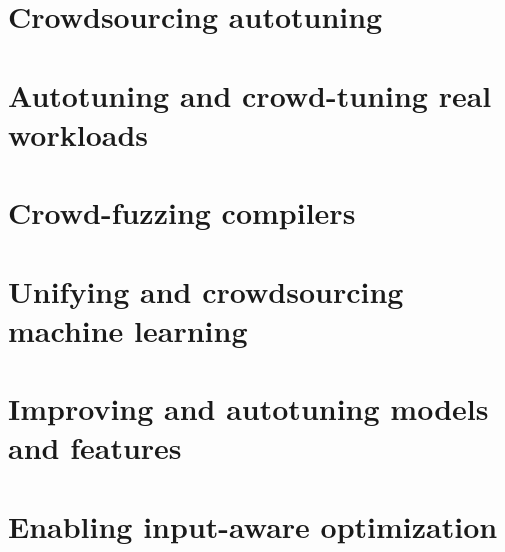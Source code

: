 \documentclass[10pt,letterpaper,twocolumn]{article}
\begin{document}
\section{Crowdsourcing autotuning}
\label{sec:crowdtuning}


\section{Autotuning and crowd-tuning real workloads}
\label{sec:collaborative}


\section{Crowd-fuzzing compilers}
\label{sec:crowdfuzzing}


\section{Unifying and crowdsourcing machine learning}
\label{sec:crowdmodeling}


\section{Improving and autotuning models and features}
\label{sec:features}


\section{Enabling input-aware optimization}
\label{sec:datasets}

\end{document}
